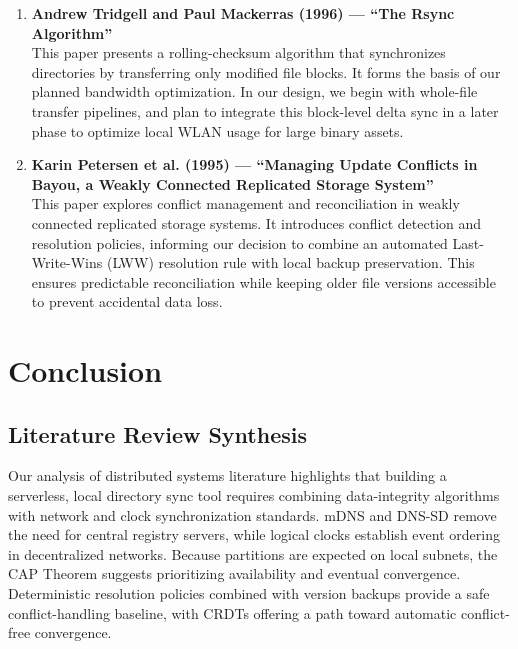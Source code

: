 \documentclass[11pt,oneside]{article}
\begin{document}
\begin{enumerate}
    \item \textbf{Andrew Tridgell and Paul Mackerras (1996) --- ``The Rsync Algorithm''} \cite{rsync1996} \\
    This paper presents a rolling-checksum algorithm that synchronizes directories by transferring only modified file blocks. It forms the basis of our planned bandwidth optimization. In our design, we begin with whole-file transfer pipelines, and plan to integrate this block-level delta sync in a later phase to optimize local WLAN usage for large binary assets.

    \item \textbf{Karin Petersen et al. (1995) --- ``Managing Update Conflicts in Bayou, a Weakly Connected Replicated Storage System''} \cite{bayou1995} \\
    This paper explores conflict management and reconciliation in weakly connected replicated storage systems. It introduces conflict detection and resolution policies, informing our decision to combine an automated Last-Write-Wins (LWW) resolution rule with local backup preservation. This ensures predictable reconciliation while keeping older file versions accessible to prevent accidental data loss.
\end{enumerate}

\section{Conclusion}

\subsection{Literature Review Synthesis}
Our analysis of distributed systems literature highlights that building a serverless, local directory sync tool requires combining data-integrity algorithms with network and clock synchronization standards. mDNS and DNS-SD \cite{rfc6762, rfc6763} remove the need for central registry servers, while logical clocks \cite{lamport1978} establish event ordering in decentralized networks. Because partitions are expected on local subnets, the CAP Theorem \cite{brewer2002} suggests prioritizing availability and eventual convergence. Deterministic resolution policies combined with version backups \cite{bayou1995} provide a safe conflict-handling baseline, with CRDTs \cite{shapiro2011} offering a path toward automatic conflict-free convergence.
\end{document}
